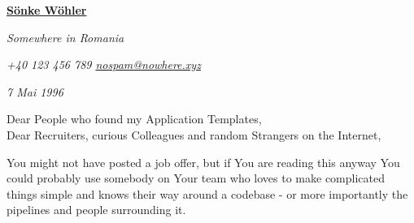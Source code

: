 \documentclass[paper=a4,fontsize=11pt]{scrartcl} %
\newcommand{\sepspace}{\vspace*{1em}}    %
\newcommand{\MyName}[1]{ %
  \Huge \hfill \textbf{#1}\par 
  \hrulefill
  \normalsize \normalfont}
\newcommand{\MyAddress}[3]{ %
  \par \usefont{OT1}{phv}{m}{n}\hfill \textit{#1}
  \par \usefont{OT1}{phv}{m}{n}\hfill \textit{#2}
  \par \usefont{OT1}{phv}{m}{n}\hfill \textit{#3}
  \par \normalfont}
\begin{document}



  \newcommand{\StylisedName}{
    \MyName{
          \href{https://www.linkedin.com/in/sonke-wohler-54657a145/}
      { \textcolor{headerColor}{S\"onke W\"ohler} }
    }
  }

  \newcommand{\MyDate}{
    \footnotesize Cri`sana 21.01.2022 \normalsize \\
  }
  \newcommand{\SameAddress}{
    \MyAddress
      { \textcolor{titleColor}{ Somewhere in Romania }}
      { \textcolor{titleColor}{ +40 123 456 789 \hspace{5pt} \href{mailto:nobody@gmail.com}{nospam@nowhere.xyz} }}
      { \textcolor{titleColor}{ 7 Mai 1996 }}
  }

  \newcommand{\CoverAddress}{
    \footnotesize \SameAddress
    \normalsize
  }


  \StylisedName
  \CoverAddress

  \sepspace %
  
  \noindent
  Dear People who found my Application Templates,  \\
  Dear Recruiters, curious Colleagues and random Strangers on the Internet,
  
  \sepspace 

  \noindent  You might not have posted a job offer, but if You are reading this
  anyway You could probably use somebody on Your team who loves to make
  complicated things simple and knows their way around a codebase - or more
  importantly the pipelines and people surrounding it.

  \sepspace
  
\end{document}
